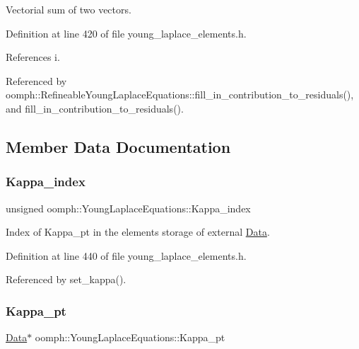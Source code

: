 Vectorial sum of two vectors. 



Definition at line 420 of file young\+\_\+laplace\+\_\+elements.\+h.



References i.



Referenced by oomph\+::\+Refineable\+Young\+Laplace\+Equations\+::fill\+\_\+in\+\_\+contribution\+\_\+to\+\_\+residuals(), and fill\+\_\+in\+\_\+contribution\+\_\+to\+\_\+residuals().



\subsection{Member Data Documentation}
\mbox{\label{classoomph_1_1YoungLaplaceEquations_ab64b10fcc80fe799f20c2dd04c8cef81}} 
\subsubsection{\texorpdfstring{Kappa\+\_\+index}{Kappa\_index}}
{\footnotesize\ttfamily unsigned oomph\+::\+Young\+Laplace\+Equations\+::\+Kappa\+\_\+index\hspace{0.3cm}{\ttfamily [protected]}}



Index of Kappa\+\_\+pt in the element\textquotesingle{}s storage of external \hyperlink{classoomph_1_1Data}{Data}. 



Definition at line 440 of file young\+\_\+laplace\+\_\+elements.\+h.



Referenced by set\+\_\+kappa().

\mbox{\label{classoomph_1_1YoungLaplaceEquations_ac7e5591f67c7355051b246043a0d7dc2}} 
\subsubsection{\texorpdfstring{Kappa\+\_\+pt}{Kappa\_pt}}
{\footnotesize\ttfamily \hyperlink{classoomph_1_1Data}{Data}$\ast$ oomph\+::\+Young\+Laplace\+Equations\+::\+Kappa\+\_\+pt\hspace{0.3cm}{\ttfamily [private]}}



